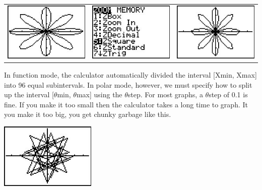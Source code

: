 \begin{center}

\begin{tabular}{ccc}

\includegraphics[width=1.8in]{./AppExtGraphics/Polar06.jpg} &
\hspace{0.05in} \includegraphics[width=1.8in]{./AppExtGraphics/Polar07.jpg} & 
\hspace{0.05in} \includegraphics[width=1.8in]{./AppExtGraphics/Polar08.jpg} \\

\end{tabular} 

\end{center}

In function mode, the calculator automatically divided the interval [Xmin, Xmax] into 96 equal subintervals.  In polar mode, however, we must specify how to split up the interval [$\theta$min, $\theta$max] using the $\theta$step.  For most graphs, a $\theta$step of 0.1 is fine.  If you make it too small then the calculator takes a long time to graph.  It you make it too big, you get chunky garbage like this.

\begin{center}

\includegraphics[width=1.8in]{./AppExtGraphics/Polar09.jpg} 

\end{center}

